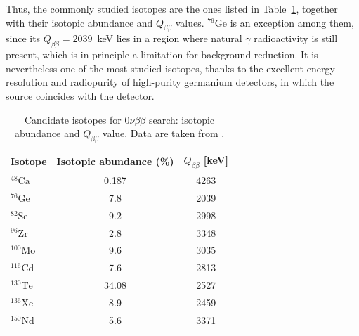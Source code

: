 Thus, the commonly studied isotopes are the ones listed in Table~\ref{tab:isotopes-for-0nu}, together with their isotopic abundance and $Q_{\beta\beta}$ values. ${}^{76}$Ge is an exception among them, since its $Q_{\beta\beta} = 2039$~keV lies in a region where natural $\gamma$ radioactivity is still present, which is in principle a limitation for background reduction. It is nevertheless one of the most studied isotopes, thanks to the excellent energy resolution and radiopurity of high-purity germanium detectors, in which the source coincides with the detector.

\begin{table}[H]
    \centering
    \begin{tabular}{lcc}
        \toprule
        Isotope & Isotopic abundance (\%) & $Q_{\beta\beta}$ [keV] \\
        \midrule
        ${}^{48}\text{Ca}$  & 0.187 & 4263 \\
        ${}^{76}\text{Ge}$  & 7.8   & 2039 \\
        ${}^{82}\text{Se}$  & 9.2   & 2998 \\
        ${}^{96}\text{Zr}$  & 2.8   & 3348 \\
        ${}^{100}\text{Mo}$ & 9.6   & 3035 \\
        ${}^{116}\text{Cd}$ & 7.6   & 2813 \\
        ${}^{130}\text{Te}$ & 34.08 & 2527 \\
        ${}^{136}\text{Xe}$ & 8.9   & 2459 \\
        ${}^{150}\text{Nd}$ & 5.6   & 3371 \\
        \bottomrule
    \end{tabular}
    \caption{Candidate isotopes for $0\nu\beta\beta$ search: isotopic abundance and $Q_{\beta\beta}$ value. Data are taken from \cite{review-0nu-2015}.}
    \label{tab:isotopes-for-0nu}
\end{table}

